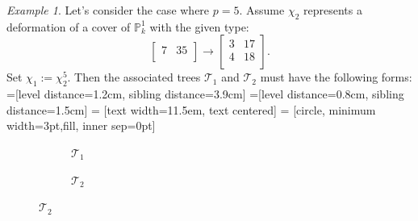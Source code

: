 \documentclass{compositio}
\theoremstyle{remark}
\newtheorem{example}[theorem]{Example}
\theoremstyle{remark}
\begin{document}
\begin{example}
    Let's consider the case where $p=5$. Assume $\chi_2$ represents a deformation of a cover of $\mathbb{P}^1_k$ with the given type:
    \[\begin{bmatrix}
    7 & 35 \\
    \end{bmatrix} \xrightarrow{}  \begin{bmatrix}
   3 & 17 \\
   4 & 18 \\
   \end{bmatrix}. \] 
   Set $\chi_1:=\chi_2^5$. Then the associated trees $\mathcal{T}_1$ and $\mathcal{T}_2$ must have the following forms:
       =[level distance=1.2cm, sibling distance=3.9cm]
=[level distance=0.8cm, sibling distance=1.5cm]
 = [text width=11.5em, text centered]
 = [circle, minimum width=3pt,fill, inner sep=0pt]
\begin{figure}[h]
\begin{subfigure}{.5\textwidth}
  \centering
{}
  \caption{$\mathcal{T}_1$}
\end{subfigure}%
\begin{subfigure}{.5\textwidth}
  \centering
{}
  \caption{$\mathcal{T}_2$}
\end{subfigure}%
\end{figure}


\end{example}
\end{document}
